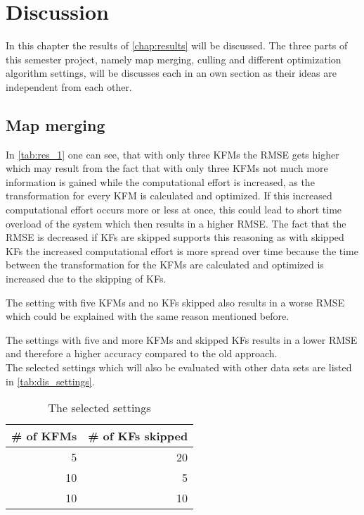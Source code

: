 \chapter{Discussion}
In this chapter the results of \autoref{chap:results} will be discussed. The three parts of this semester project, namely map merging, culling and different optimization algorithm settings, will be discusses each in an own section as their ideas are independent from each other.

\section{Map merging}
In \autoref{tab:res_1} one can see, that with only three \acp{KFM} the \ac{RMSE} gets higher which may result from the fact that with only three \acp{KFM} not much more information is gained while the computational effort is increased, as the transformation for every \ac{KFM} is calculated and optimized. If this increased computational effort occurs more or less at once, this could lead to short time overload of the system which then results in a higher \ac{RMSE}. The fact that the \ac{RMSE} is decreased if \acp{KF} are skipped supports this reasoning as with skipped \acp{KF} the increased computational effort is more spread over time because the time between the transformation for the \acp{KFM} are calculated and optimized is increased due to the skipping of \acp{KF}.

The setting with five \acp{KFM} and no \acp{KF} skipped also results in a worse \ac{RMSE} which could be explained with the same reason mentioned before.

The settings with five and more \acp{KFM} and skipped \acp{KF} results in a lower \ac{RMSE} and therefore a higher accuracy compared to the old approach.\\

The selected settings which will also be evaluated with other data sets are listed in \autoref{tab:dis_settings}.

\begin{table}[ht!]
  \begin{center}
  \begin{tabular}{r|r}
    \# of \acp{KFM} & \# of \acp{KF} skipped  \\ 
    \hline 
    5 & 20 \\ 
    10 & 5 \\ 
    10 & 10 \\ 
  \end{tabular} 
  \end{center}
  \caption{The selected settings}
  \label{tab:dis_settings}
\end{table}

